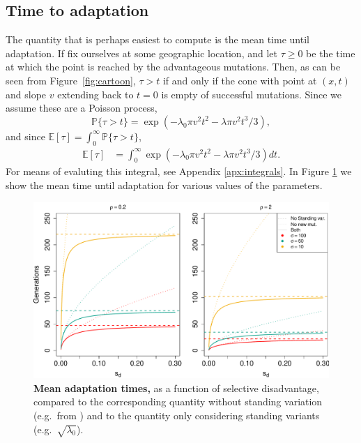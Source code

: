 \documentclass{article}
\renewcommand{\P}{\mathbb{P}}
\newcommand{\E}{\mathbb{E}}
\begin{document}

\subsection{Time to adaptation}

The quantity that is perhaps easiest to compute is the mean time until adaptation.
If fix ourselves at some geographic location, and let $\tau\ge0$ be the time at which the point is reached by the advantageous mutations.
Then, as can be seen from Figure~\ref{fig:cartoon},
$\tau > t$ if and only if the cone with point at $(x,t)$ and slope $v$ extending back to $t=0$ is empty of successful mutations.
Since we assume these are a Poisson process, 
\[
    \P\{ \tau > t \} = \exp\left( - \lambda_0 \pi v^2 t^2 - \lambda \pi v^2 t^3 / 3 \right) ,
\]
and since $\E[\tau] = \int_0^\infty \P\{ \tau > t \}$,
\begin{align}
    \E[\tau] %
        &= \int_0^\infty \exp\left( - \lambda_0 \pi v^2 t^2 - \lambda \pi v^2 t^3 / 3 \right) dt.
\end{align}
For means of evaluting this integral, see Appendix \ref{apx:integrals}.
In Figure \ref{G6PD_chartimes} we show the mean time until adaptation for various values of the parameters.

\begin{figure}[ht]
\begin{center}
  \includegraphics[width=1.0\textwidth]{G6PD_chartimes}   %
\caption{ %
{\bf Mean adaptation times,} as a function of selective disadvantage, compared to the corresponding quantity without standing variation (e.g.\ from \cite{ralphcoop2010}) and to the quantity only considering standing variants (e.g.\ $\sqrt{\lambda_0}$).
} \label{G6PD_chartimes}
\end{center}
\end{figure}
\end{document}
